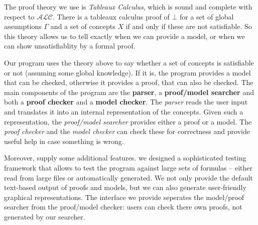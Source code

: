 The proof theory we use is \emph{Tableaux Calculus}, which is sound and complete
with respect to $\mathcal{ALC}$. There is a tableaux calculus proof of $\bot$ for
a set of global assumptions $\Gamma$ and a set of concepts $X$ if and only if these
are not satisfiable. So this theory allows us to tell exactly when we can provide
a model, or when we can show unsatisfiablity by a formal proof.

Our program uses the theory above to say whether a set of concepts is satisfiable or
not (assuming some global knowledge). If it is, the program provides a model that can
be checked, otherwise it provides a proof, that can also be checked. The main components
of the program are the \textbf{parser}, a \textbf{proof/model searcher} and
both a \textbf{proof checker} and a \textbf{model checker}. The \emph{parser} reads the
user input and translates it into an internal representation of the concepts. Given
such a representation, the \emph{proof/model searcher} provides either a proof or a
model. The \emph{proof checker} and the \emph{model checker} can check these for
correctness and provide useful help in case something is wrong.

Moreover, supply some additional features.
we designed a sophisticated testing framework that allows to test the
program against large sets of formulas -- either read from large files or automatically
generated. We not only provide the default text-based output of proofs and models, but
we can also generate user-friendly graphical representations. The interface we provide
seperates the model/proof searcher from the proof/model checker: users can check there
own proofs, not generated by our searcher.